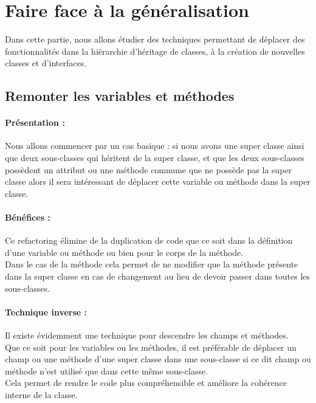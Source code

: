 \documentclass[a4paper,twoside,12pt,openright]{report}
\begin{document}
\newpage
\section{Faire face à la généralisation}
Dans cette partie, nous allons étudier des techniques permettant de déplacer des fonctionnalités dans la hiérarchie d'héritage de classes, à la création de nouvelles classes et d'interfaces.\\



\subsection{Remonter les variables et méthodes}
\paragraph{Présentation :}
Nous allons commencer par un cas basique : si nous avons une super classe ainsi que deux sous-classes qui héritent de la super classe, et que les deux sous-classes possèdent un attribut ou une méthode commune que ne possède pas la super classe alors il sera intéressant de déplacer cette variable ou méthode dans la super classe.\\

\paragraph{Bénéfices :}
Ce refactoring élimine de la duplication de code que ce soit dans la définition d'une variable ou méthode ou bien pour le corps de la méthode.\\
Dans le cas de la méthode cela permet de ne modifier que la méthode présente dans la super classe en cas de changement au lieu de devoir passer dans toutes les sous-classes.\\

\paragraph{Technique inverse :}
Il existe évidemment une technique pour descendre les champs et méthodes.\\
Que ce soit pour les variables ou les méthodes, il est préférable de déplacer un champ ou une méthode d'une super classe dans une sous-classe si ce dit champ ou méthode n'est utilisé que dans cette même sous-classe.\\
Cela permet de rendre le code plus compréhensible et améliore la cohérence interne de la classe.\\
\end{document}
